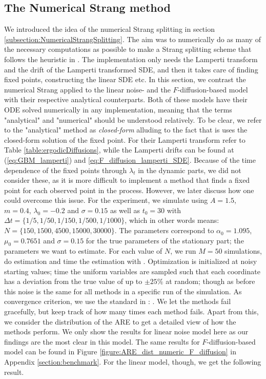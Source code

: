 \subsection{The Numerical Strang method}
We introduced the idea of the numerical Strang splitting in section \ref{subsection:NumericalStrangSplitting}. The aim was to numerically do as many of the necessary computations as possible to make a Strang splitting scheme that follows the heuristic in \cite{SplittingSchemes}. The implementation only needs the Lamperti transform and the drift of the Lamperti transformed SDE, and then it takes care of finding fixed points, constructing the linear SDE etc. In this section, we contrast the numerical Strang applied to the linear noise- and the $F$-diffusion-based model with their respective analytical counterparts. Both of these models have their ODE solved numerically in any implementation, meaning that the terms "analytical" and "numerical" should be understood relatively. To be clear, we refer to the "analytical" method as \textit{closed-form} alluding to the fact that is uses the closed-form solution of the fixed point. For their Lamperti transform refer to Table \ref{table:ergodicDiffusions}, while the Lamperti drifts can be found at (\ref{eq:GBM_lamperti}) and \ref{eq:F_diffusion_lamperti_SDE}. Because of the time dependence of the fixed points through $\lambda_t$ in the dynamic parts, we did not consider these, as it is more difficult to implement a method that finds a fixed point for each observed point in the process. However, we later discuss how one could overcome this issue. For the experiment, we simulate using $A = 1.5$, $m=0.4$, $\lambda_0 = -0.2$ and $\sigma =0.15$ as well as $t_0 = 30$ with $\Delta t = \{1/5, 1/50, 1/150, 1/500, 1/1000\}$, which in other words means: $N =  \{150, 1500, 4500, 15000, 30000\}$.  The parameters correspond to $\alpha_0 = 1.095$, $\mu_0 = 0.7651$ and $\sigma = 0.15$ for the true parameters of the stationary part; the parameters we want to estimate. For each value of $N$, we run $M = 50$ simulations, do estimation and time the estimation with .
Optimization is initialized at noisy starting values; time the uniform variables are sampled such that each coordinate has a deviation from the true value of up to $\pm 25\%$ at random; though as before this noise is the same for all methods in a specific run of the simulation. As convergence criterion, we use the standard in : . We let the methods fail gracefully, but keep track of how many times each method fails. Apart from this, we consider the distribution of the ARE to get a detailed view of how the methods perform. We only show the results for linear noise model here as our findings are the most clear in this model. The same results for $F$-diffusion-based model can be found in Figure \ref{figure:ARE_dist_numeric_F_diffusion} in Appendix \ref{section:benchmark}. For the linear model, though, we get the following result.
